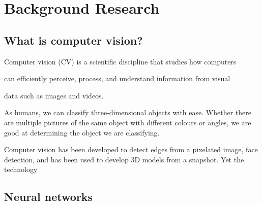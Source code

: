 \documentclass[12pt]{report}
\begin{document}
\thispagestyle{empty}   %

\tableofcontents

\chapter{Background Research}


\section{What is computer vision?}

\vspace{20pt}

\centerline{Computer vision (CV) is a scientific discipline that studies how computers}
\centerline{can efficiently perceive, process, and understand information from visual}
\centerline{data such as images and videos.}

\vspace{20pt}

As humans, we can classify three-dimensional objects with ease. Whether there are multiple pictures of the same object with different colours or angles, we are good at determining the object we are classifying. 

Computer vision has been developed to detect edges from a pixelated image, face detection, and has been used to develop 3D models from a snapshot. Yet the technology 

\section{Neural networks}
\end{document}
